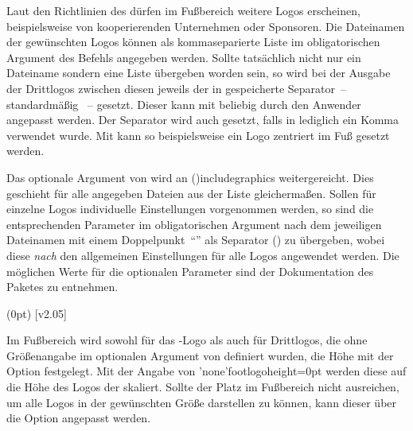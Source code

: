 \begin{DeclareEntity*}{}
\begin{DeclareEntity*}{}
\begin{DeclareEntity*}{}
\begin{Declaration}
\begin{Declaration}
Laut den Richtlinien des \CDs dürfen im Fußbereich weitere Logos erscheinen, 
beispielsweise von kooperierenden Unternehmen oder Sponsoren. Die Dateinamen 
der gewünschten Logos können als kommaseparierte Liste im obligatorischen 
Argument des Befehls  angegeben werden. Sollte tatsächlich 
nicht nur ein Dateiname sondern eine Liste übergeben worden sein, so wird bei 
der Ausgabe der Drittlogos zwischen diesen jeweils der in  
gespeicherte Separator~-- standardmäßig ~-- gesetzt. Dieser kann 
mit  
beliebig durch den Anwender angepasst werden. Der Separator wird auch gesetzt, 
falls in  lediglich ein Komma verwendet wurde. Mit 
 kann so beispielsweise ein 
Logo zentriert im Fuß gesetzt werden.

Das optionale Argument von  wird an 
\Macro(){includegraphics}
weitergereicht. Dies geschieht für alle angegeben Dateien aus der Liste 
gleichermaßen. Sollen für einzelne Logos individuelle Einstellungen vorgenommen 
werden, so sind die entsprechenden Parameter im obligatorischen Argument nach 
dem jeweiligen Dateinamen mit einem Doppelpunkt~\enquote{\PValue{:}} als 
Separator () zu 
übergeben, wobei diese \emph{nach} den allgemeinen Einstellungen für alle Logos 
angewendet werden. Die möglichen Werte für die optionalen Parameter sind der 
Dokumentation des Paketes  zu entnehmen.
\end{Declaration}
\end{Declaration}

\begin{Declaration}
  {}
  (0pt)
  [v2.05]

Im Fußbereich wird sowohl für das \DDC-Logo als auch für Drittlogos, die ohne 
Größenangabe im optionalen Argument von  definiert wurden, die 
Höhe mit der Option  festgelegt. Mit der Angabe 
von  \Option*'none'{footlogoheight=0pt} werden diese auf die Höhe des Logos der 
\TnUD skaliert. Sollte der Platz im Fußbereich nicht ausreichen, um alle Logos 
in der gewünschten Größe darstellen zu können, kann dieser über die Option
 angepasst werden.
\end{Declaration}


\end{DeclareEntity*}
\end{DeclareEntity*}
\end{DeclareEntity*}
